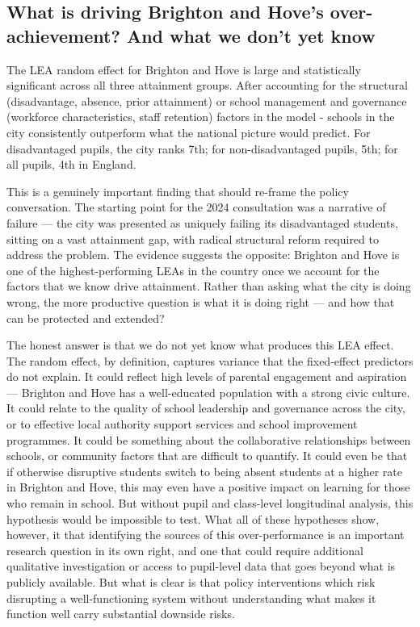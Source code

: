 \documentclass[
  12pt,
  titlepage]{article}
\begin{document}
\subsection{What is driving Brighton and Hove's over-achievement? And
what we don't yet
know}\label{what-is-driving-brighton-and-hoves-over-achievement-and-what-we-dont-yet-know}

The LEA random effect for Brighton and Hove is large and statistically
significant across all three attainment groups. After accounting for the
structural (disadvantage, absence, prior attainment) or school
management and governance (workforce characteristics, staff retention)
factors in the model - schools in the city consistently outperform what
the national picture would predict. For disadvantaged pupils, the city
ranks 7th; for non-disadvantaged pupils, 5th; for all pupils, 4th in
England.

This is a genuinely important finding that should re-frame the policy
conversation. The starting point for the 2024 consultation was a
narrative of failure --- the city was presented as uniquely failing its
disadvantaged students, sitting on a vast attainment gap, with radical
structural reform required to address the problem. The evidence suggests
the opposite: Brighton and Hove is one of the highest-performing LEAs in
the country once we account for the factors that we know drive
attainment. Rather than asking what the city is doing wrong, the more
productive question is what it is doing right --- and how that can be
protected and extended?

The honest answer is that we do not yet know what produces this LEA
effect. The random effect, by definition, captures variance that the
fixed-effect predictors do not explain. It could reflect high levels of
parental engagement and aspiration --- Brighton and Hove has a
well-educated population with a strong civic culture. It could relate to
the quality of school leadership and governance across the city, or to
effective local authority support services and school improvement
programmes. It could be something about the collaborative relationships
between schools, or community factors that are difficult to quantify. It
could even be that if otherwise disruptive students switch to being
absent students at a higher rate in Brighton and Hove, this may even
have a positive impact on learning for those who remain in school. But
without pupil and class-level longitudinal analysis, this hypothesis
would be impossible to test. What all of these hypotheses show, however,
it that identifying the sources of this over-performance is an important
research question in its own right, and one that could require
additional qualitative investigation or access to pupil-level data that
goes beyond what is publicly available. But what is clear is that policy
interventions which risk disrupting a well-functioning system without
understanding what makes it function well carry substantial downside
risks.
\end{document}
